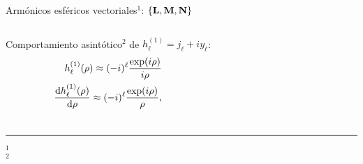 \begin{frame}{Armónicos esféricos vectoriales$^1$: $\{\vb{L},\vb{M}, \vb{N}\}$}
\begin{columns}
 Comportamiento asintótico$^2$ de $h^{(1)}_\ell= j_\ell + i y_\ell$:
\begin{align*}
	h_\ell^{(1)}(\rho)\approx (-i)^\ell \frac{\exp(i\rho)}{i\rho}
	\\
	\dv{h_\ell^{(1)}(\rho)}{\rho} \approx (-i)^\ell \frac{\exp(i\rho)}{\rho},
\end{align*}
\end{columns}
\vspace*{1em}
	\noindent\rule{.25\textwidth}{0.4pt}
 \begin{spacing}{0}\fontsize{4}{12} \selectfont
	$^1$ \\
	$^2$ 
	\end{spacing}

  \end{frame}



